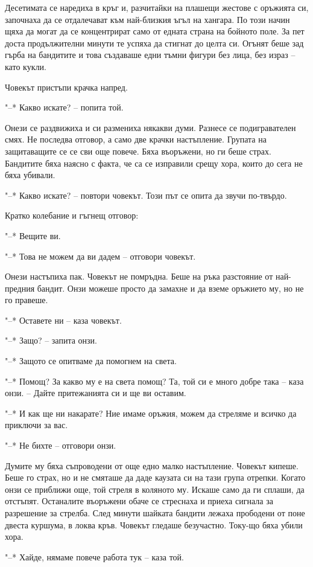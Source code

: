 \documentclass[ebook,openany,12pt]{memoir}
\begin{document}
Десетимата се наредиха в кръг и, разчитайки на плашещи жестове с оръжията си, започнаха да се отдалечават към най-близкия ъгъл на хангара. По този начин щяха да могат да се концентрират само от едната страна на бойното поле. За пет доста продължителни минути те успяха да стигнат до целта си. Огънят беше зад гърба на бандитите и това създаваше едни тъмни фигури без лица, без израз – като кукли.

Човекът пристъпи крачка напред.

"--* Какво искате? – попита той.

Онези се раздвижиха и си размениха някакви думи. Разнесе се подигравателен смях. Не последва отговор, а само две крачки настъпление. Групата на защитаващите се се сви още повече. Бяха въоръжени, но ги беше страх. Бандитите бяха наясно с факта, че са се изправили срещу хора, които до сега не бяха убивали.

"--* Какво искате? – повтори човекът. Този път се опита да звучи по-твърдо.

Кратко колебание и гъгнещ отговор:

"--* Вещите ви.

"--* Това не можем да ви дадем – отговори човекът.

Онези настъпиха пак. Човекът не помръдна. Беше на ръка разстояние от най-предния бандит. Онзи можеше просто да замахне и да вземе оръжието му, но не го правеше.

"--* Оставете ни – каза човекът.

"--* Защо? – запита онзи.

"--* Защото се опитваме да помогнем на света.

"--* Помощ? За какво му е на света помощ? Та, той си е много добре така – каза онзи. – Дайте притежанията си и ще ви оставим.

"--* И как ще ни накарате? Ние имаме оръжия, можем да стреляме и всичко да приключи за вас.

"--* Не бихте – отговори онзи.

Думите му бяха съпроводени от още едно малко настъпление. Човекът кипеше. Беше го страх, но и не смяташе да даде каузата си на тази група отрепки. Когато онзи се приближи още, той стреля в коляното му. Искаше само да ги сплаши, да отстъпят. Останалите въоръжени обаче се стреснаха и приеха сигнала за разрешение за стрелба. След минути шайката бандити лежаха прободени от поне двеста куршума, в локва кръв. Човекът гледаше безучастно. Току-що бяха убили хора.

"--* Хайде, нямаме повече работа тук – каза той.
\end{document}
